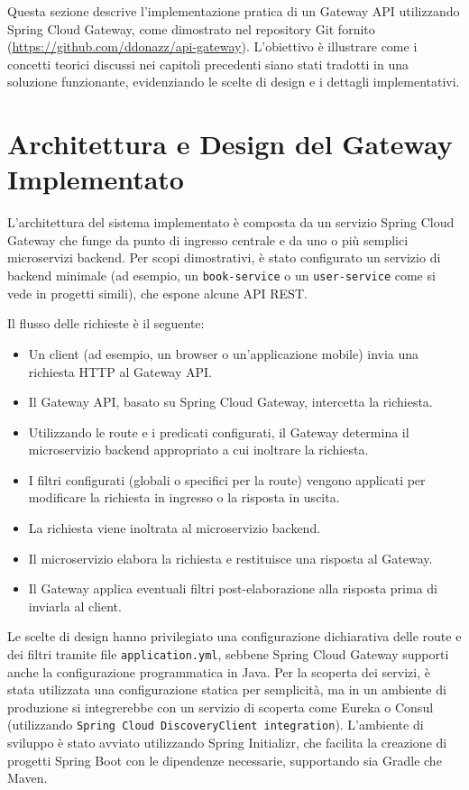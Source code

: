 Questa sezione descrive l'implementazione pratica di un Gateway API utilizzando Spring Cloud Gateway, come dimostrato nel repository Git fornito (\url{https://github.com/ddonazz/api-gateway}). L'obiettivo è illustrare come i concetti teorici discussi nei capitoli precedenti siano stati tradotti in una soluzione funzionante, evidenziando le scelte di design e i dettagli implementativi.

\section{Architettura e Design del Gateway Implementato}

L'architettura del sistema implementato è composta da un servizio Spring Cloud Gateway che funge da punto di ingresso centrale e da uno o più semplici microservizi backend. Per scopi dimostrativi, è stato configurato un servizio di backend minimale (ad esempio, un \texttt{book-service} o un \texttt{user-service} come si vede in progetti simili), che espone alcune API REST.

Il flusso delle richieste è il seguente:
\begin{itemize}
    \item Un client (ad esempio, un browser o un'applicazione mobile) invia una richiesta HTTP al Gateway API.
    \item Il Gateway API, basato su Spring Cloud Gateway, intercetta la richiesta.
    \item Utilizzando le route e i predicati configurati, il Gateway determina il microservizio backend appropriato a cui inoltrare la richiesta.
    \item I filtri configurati (globali o specifici per la route) vengono applicati per modificare la richiesta in ingresso o la risposta in uscita.
    \item La richiesta viene inoltrata al microservizio backend.
    \item Il microservizio elabora la richiesta e restituisce una risposta al Gateway.
    \item Il Gateway applica eventuali filtri post-elaborazione alla risposta prima di inviarla al client.
\end{itemize}

Le scelte di design hanno privilegiato una configurazione dichiarativa delle route e dei filtri tramite file \texttt{application.yml}, sebbene Spring Cloud Gateway supporti anche la configurazione programmatica in Java. Per la scoperta dei servizi, è stata utilizzata una configurazione statica per semplicità, ma in un ambiente di produzione si integrerebbe con un servizio di scoperta come Eureka o Consul (utilizzando \texttt{Spring Cloud DiscoveryClient integration}). L'ambiente di sviluppo è stato avviato utilizzando Spring Initializr, che facilita la creazione di progetti Spring Boot con le dipendenze necessarie, supportando sia Gradle che Maven.

